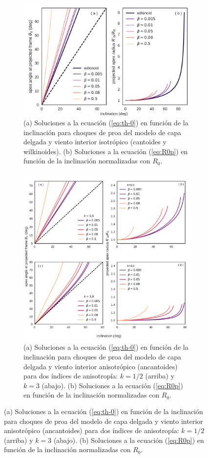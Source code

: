 \begin{figure}
\begin{figure}
  \centering
  \includegraphics[width=\linewidth]{./Figures/cantoid-th0-vs-i}
  \caption{(a) Soluciones a la ecuación (\ref{eq:th-0}) en función de la inclinación para choques de proa del modelo de capa delgada y viento interior isotrópico (cantoides y wilkinoides). (b) Soluciones a la ecuación (\ref{eq:R0p}) en función de la inclinación normalizadas con $R_0$.}
  \label{fig:th0-isotropic}
\end{figure}

\begin{figure}
  \centering
  \includegraphics[width=\linewidth]{./Figures/ancantoid-th0-vs-i}
  \caption{(a) Soluciones a la ecuación (\ref{eq:th-0}) en función de la inclinación para choques de proa del modelo de capa delgada y viento interior anisotrópico (ancantoides) para dos índices de anisotropía: $k=1/2$ (arriba) y $k=3$ (abajo). (b) Soluciones a la ecuación (\ref{eq:R0p}) en función de la inclinación normalizadas con $R_0$.}
  \label{fig:th0-anisotropic}
\end{figure}


\end{figure}
